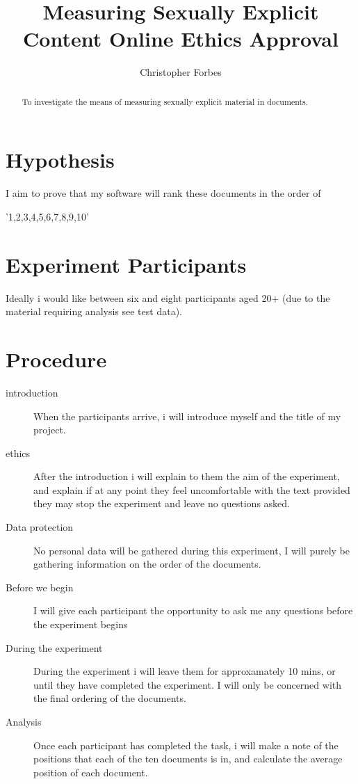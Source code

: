 \documentclass{article}
\begin{document}
\title{Measuring Sexually Explicit Content Online Ethics Approval}
\author{Christopher Forbes}

\maketitle

\begin{abstract}
To investigate the means of measuring sexually explicit material in documents.
\end{abstract}

\section*{Hypothesis}
I aim to prove that my software will rank these documents in the order of

'1,2,3,4,5,6,7,8,9,10'
\section*{Experiment Participants}
Ideally i would like between six and eight participants aged 20+ (due to the material requiring analysis see test data).
\section*{Procedure}
\begin{description}
\item[introduction]
When the participants arrive, i will introduce myself and the title of my project.
\item[ethics]
After the introduction i will explain to them the aim of the experiment, and explain if at any point they feel uncomfortable with the text provided they may stop the experiment and leave no questions asked.
\item[Data protection]
No personal data will be gathered during this experiment, I will purely be gathering information on the order of the documents.
\item[Before we begin]
I will give each participant the opportunity to ask me any questions before the experiment begins
\item[During the experiment]
During the experiment i will leave them for approxamately 10 mins, or until they have completed the experiment. I will only be concerned with the final ordering of the documents.
\item[Analysis]
Once each participant has completed the task, i will make a note of the positions that each of the ten documents is in, and calculate the average position of each document.
\end{description}
\end{document}
